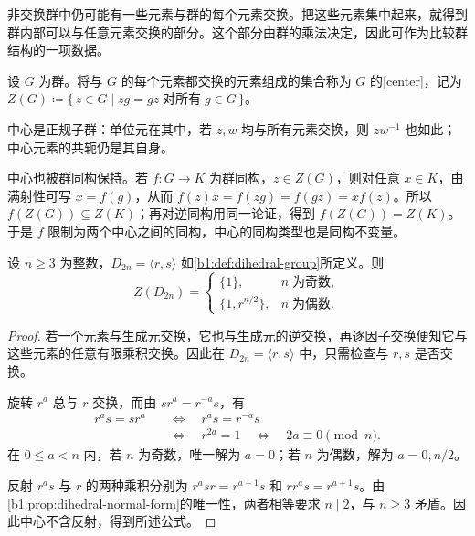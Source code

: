 \ProseParagraphBreak
非交换群中仍可能有一些元素与群的每个元素交换。把这些元素集中起来，就得到群内部可以与任意元素交换的部分。这个部分由群的乘法决定，因此可作为比较群结构的一项数据。

\begin{definition}\label{b1:def:center}
	设 \(G\) 为群。将与 \(G\) 的每个元素都交换的元素组成的集合称为 \(G\) 的[center]，记为 \(Z(G)\coloneqq\{\,z\in G\mid zg=gz\;\text{对所有}\;g\in G\,\}\)。
\end{definition}

中心是正规子群：单位元在其中，若 \(z,w\) 均与所有元素交换，则 \(zw^{-1}\) 也如此；中心元素的共轭仍是其自身。

\ProseParagraphBreak
中心也被群同构保持。若 \(f:G\rightarrow K\) 为群同构，\(z\in Z(G)\)，则对任意 \(x\in K\)，由满射性可写 \(x=f(g)\)，从而 \(f(z)x=f(zg)=f(gz)=xf(z)\)。所以 \(f(Z(G))\subseteq Z(K)\)；再对逆同构用同一论证，得到 \(f(Z(G))=Z(K)\)。于是 \(f\) 限制为两个中心之间的同构，中心的同构类型也是同构不变量。

\begin{proposition}[二面体群的中心]\label{b1:prop:dihedral-center}
	设 \(n\geq3\) 为整数，\(D_{2n}=\langle r,s\rangle\) 如\cref{b1:def:dihedral-group}所定义。则
	\[
		Z(D_{2n})=
		\begin{cases}
			\{1\},&n\;\text{为奇数},\\
			\{1,r^{n/2}\},&n\;\text{为偶数}.
		\end{cases}
	\]
\end{proposition}
\begin{proof}
	若一个元素与生成元交换，它也与生成元的逆交换，再逐因子交换便知它与这些元素的任意有限乘积交换。因此在 \(D_{2n}=\langle r,s\rangle\) 中，只需检查与 \(r,s\) 是否交换。

	旋转 \(r^a\) 总与 \(r\) 交换，而由 \(sr^a=r^{-a}s\)，有
	\[
		\begin{aligned}
			r^as=sr^a &\quad\Longleftrightarrow\quad r^as=r^{-a}s\\
			&\quad\Longleftrightarrow\quad r^{2a}=1 \quad\Longleftrightarrow\quad 2a\equiv0\pmod n.
		\end{aligned}
	\]
	在 \(0\leq a<n\) 内，若 \(n\) 为奇数，唯一解为 \(a=0\)；若 \(n\) 为偶数，解为 \(a=0,n/2\)。

	反射 \(r^as\) 与 \(r\) 的两种乘积分别为 \(r^asr=r^{a-1}s\) 和 \(rr^as=r^{a+1}s\)。由\cref{b1:prop:dihedral-normal-form}的唯一性，两者相等要求 \(n\mid2\)，与 \(n\geq3\) 矛盾。因此中心不含反射，得到所述公式。
\end{proof}

